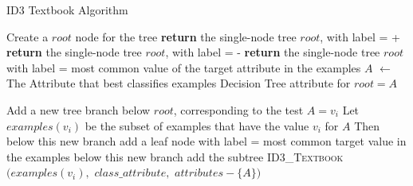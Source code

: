 \begin{algorithm}[H]
\caption{ID3 Textbook Algorithm}\label{a:id3-simple}
\begin{algorithmic}[1]

    \State Create a $root$ node for the tree
        \State \textbf{return} the single-node tree $root$, with label = +
        \State \textbf{return} the single-node tree $root$, with label = -
        \State \textbf{return} the single-node tree $root$ with label = most common value of the target attribute in the examples
    \Else
        \State $A$ $\gets$ The Attribute that best classifies examples
        \State Decision Tree attribute for $root = A$

            \State Add a new tree branch below $root$, corresponding to the test $A = v_i$
            \State Let $examples(v_i)$ be the subset of examples that have the value $v_i$ for $A$
                \State Then below this new branch add a leaf node with label = most common target value in the examples
            \Else
                \State below this new branch add the subtree \textsc{ID3\_Textbook}$(examples(v_i),$ $class\_attribute,$ $attributes - \{A\})$
            \EndIf
        \EndFor
    \EndIf
\EndProcedure

\end{algorithmic}
\end{algorithm}



